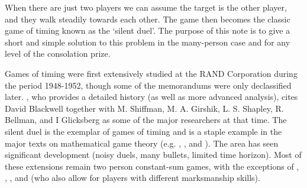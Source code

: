 \documentclass[11pt,a4paper]{article}%
\numberwithin{equation}{section}
\theoremstyle{plain}
\begin{document}
When there are just two players we can assume the target is the other player, and they walk steadily towards each other. The game then becomes the classic game of timing known as the `silent duel'. The purpose of this note is to give a short and simple solution to this problem in the many-person case and for any level of the consolation prize.
%
\par
Games of timing were first extensively studied at the RAND Corporation during the period 1948-1952, though some of the memorandums were only declassified later. \cite{Radzik1996}, who provides a detailed history (as well as more advanced analysis), cites David Blackwell together with M. Shiffman, M. A. Girshik, L. S. Shapley, R. Bellman, and I Glicksberg as some of the major researchers at that time. The silent duel is the exemplar of games of timing and is a staple example in the major texts on mathematical game theory (e.g. \cite{Owen1995}, \cite{BasarEtal1982}, and \cite{Garnaev2000}). The area has seen significant development (noisy duels, many bullets, limited time horizon). Most of these extensions remain two person constant-sum games, with the exceptions of \cite{Sakaguchi1978}, \cite{HenigONeill1992}, \cite{BastonGarnaev1995}, and \cite{PresmanSonin2006} (who also allow for players with different marksmanship skills).
%
\end{document}
